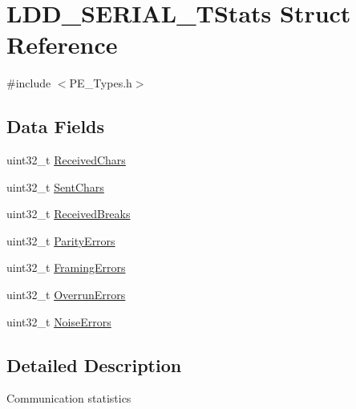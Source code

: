 \hypertarget{struct_l_d_d___s_e_r_i_a_l___t_stats}{\section{L\-D\-D\-\_\-\-S\-E\-R\-I\-A\-L\-\_\-\-T\-Stats Struct Reference}
\label{struct_l_d_d___s_e_r_i_a_l___t_stats}
}


{\ttfamily \#include $<$P\-E\-\_\-\-Types.\-h$>$}

\subsection*{Data Fields}
\begin{DoxyCompactItemize}
\item 
uint32\-\_\-t \hyperlink{struct_l_d_d___s_e_r_i_a_l___t_stats_a7dd5faa8bc6c15fde011eb6192ca6168}{Received\-Chars}
\item 
uint32\-\_\-t \hyperlink{struct_l_d_d___s_e_r_i_a_l___t_stats_a60198f844b85f9e73efaca83e32471cd}{Sent\-Chars}
\item 
uint32\-\_\-t \hyperlink{struct_l_d_d___s_e_r_i_a_l___t_stats_a45f707461666b974a6c3b5c948e66cf7}{Received\-Breaks}
\item 
uint32\-\_\-t \hyperlink{struct_l_d_d___s_e_r_i_a_l___t_stats_aba7800197922c7effa1eef7f5f5bbd0b}{Parity\-Errors}
\item 
uint32\-\_\-t \hyperlink{struct_l_d_d___s_e_r_i_a_l___t_stats_a7aa38e2a0215c73f11a5ec2e2db4c39b}{Framing\-Errors}
\item 
uint32\-\_\-t \hyperlink{struct_l_d_d___s_e_r_i_a_l___t_stats_aa8a7fee8c6a608b49b8ec1b5a603c536}{Overrun\-Errors}
\item 
uint32\-\_\-t \hyperlink{struct_l_d_d___s_e_r_i_a_l___t_stats_a024bac3a1be777c32d07a835f4c42878}{Noise\-Errors}
\end{DoxyCompactItemize}


\subsection{Detailed Description}
Communication statistics 

